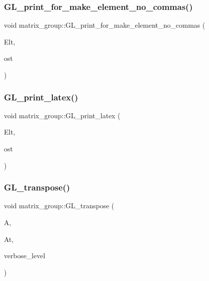 \subsubsection{\texorpdfstring{G\+L\+\_\+print\+\_\+for\+\_\+make\+\_\+element\+\_\+no\+\_\+commas()}{GL\_print\_for\_make\_element\_no\_commas()}}
{\footnotesize\ttfamily void matrix\+\_\+group\+::\+G\+L\+\_\+print\+\_\+for\+\_\+make\+\_\+element\+\_\+no\+\_\+commas (\begin{DoxyParamCaption}\item[{\mbox{\hyperlink{galois_8h_a09fddde158a3a20bd2dcadb609de11dc}{I\+NT}} $\ast$}]{Elt,  }\item[{ostream \&}]{ost }\end{DoxyParamCaption})}

\mbox{\label{classmatrix__group_a3dee033516b0e1688aefe95a483d9d76}} 
\subsubsection{\texorpdfstring{G\+L\+\_\+print\+\_\+latex()}{GL\_print\_latex()}}
{\footnotesize\ttfamily void matrix\+\_\+group\+::\+G\+L\+\_\+print\+\_\+latex (\begin{DoxyParamCaption}\item[{\mbox{\hyperlink{galois_8h_a09fddde158a3a20bd2dcadb609de11dc}{I\+NT}} $\ast$}]{Elt,  }\item[{ostream \&}]{ost }\end{DoxyParamCaption})}

\mbox{\label{classmatrix__group_aebfa0928cf2a683fcc733dfeadc8f05c}} 
\subsubsection{\texorpdfstring{G\+L\+\_\+transpose()}{GL\_transpose()}}
{\footnotesize\ttfamily void matrix\+\_\+group\+::\+G\+L\+\_\+transpose (\begin{DoxyParamCaption}\item[{\mbox{\hyperlink{galois_8h_a09fddde158a3a20bd2dcadb609de11dc}{I\+NT}} $\ast$}]{A,  }\item[{\mbox{\hyperlink{galois_8h_a09fddde158a3a20bd2dcadb609de11dc}{I\+NT}} $\ast$}]{At,  }\item[{\mbox{\hyperlink{galois_8h_a09fddde158a3a20bd2dcadb609de11dc}{I\+NT}}}]{verbose\+\_\+level }\end{DoxyParamCaption})}

